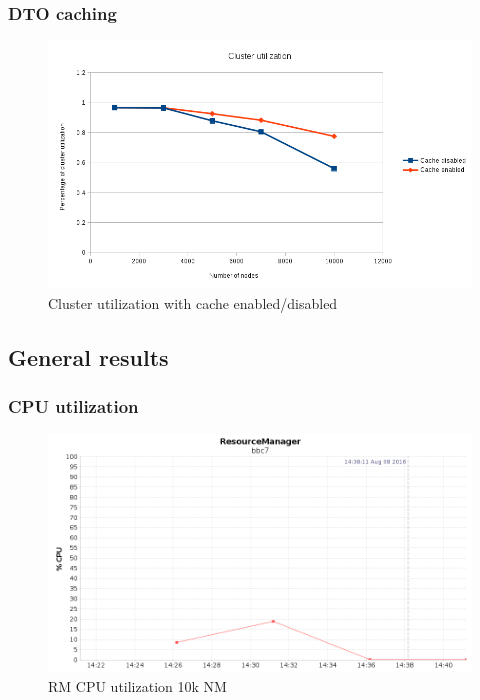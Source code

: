 \documentclass{beamer}
\begin{document}
\begin{frame}
\frametitle{DTO caching}

\begin{figure}
\centering
\includegraphics[scale=0.4]{resources/cluster_util_cache_en_di.png}
\caption{Cluster utilization with cache enabled/disabled}
\end{figure}
\end{frame}

\subsection{General results}
\begin{frame}
\frametitle{CPU utilization}

\begin{figure}
\centering

\includegraphics[scale=0.3]{resources/RM_CPU_ALL_CPU.png}
\caption{RM CPU utilization 10k NM}
\end{figure}
\end{frame}
\end{document}

